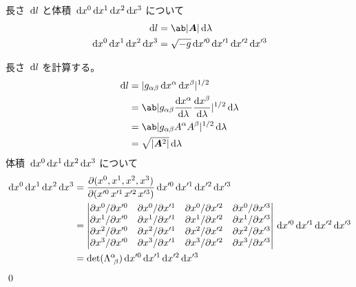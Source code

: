\documentclass[uplatex,dvipdfmx,a4paper,11pt]{jlreq}
\makeatletter
\renewcommand{\AA}{\bm{A}}
\theoremstyle{definition}
\renewenvironment{proof}[1][\proofname]{\par
  \normalfont
  \topsep6\p@\@plus6\p@ \trivlist
  \item[\hskip\labelsep{\bfseries #1}\@addpunct{\bfseries}]\ignorespaces\quad\par
}{%
  \qed\endtrivlist\@endpefalse
}
\renewcommand\proofname{証明}
\makeatother
\begin{document}
\begin{proposition}
  長さ $\dl{l}$ と体積 $\dl{x^0}\dl{x^1}\dl{x^2}\dl{x^3}$ について
  \begin{align}
    \dl{l}                           & = \ab|\AA|\dl{\lambda}                          \\
    \dl{x^0}\dl{x^1}\dl{x^2}\dl{x^3} & = \sqrt{-g}\dl{x'^0}\dl{x'^1}\dl{x'^2}\dl{x'^3}
  \end{align}
\end{proposition}
\begin{proof}
  長さ $\dl{l}$ を計算する。
  \begin{align}
    \dl{l} & = |g_{\alpha\beta}\dl{x^\alpha}\dl{x^\beta}|^{1/2}                                      \\
           & = \ab|g_{\alpha\beta}\diff{x^\alpha}{\lambda}\diff{x^\beta}{\lambda}|^{1/2}\dl{\lambda} \\
           & = \ab|g_{\alpha\beta}A^\alpha A^\beta|^{1/2}\dl{\lambda}                                \\
           & = \sqrt{|\AA^2|}\dl{\lambda}
  \end{align}
  体積 $\dl{x^0}\dl{x^1}\dl{x^2}\dl{x^3}$ について
  \begin{align}
    \dl{x^0}\dl{x^1}\dl{x^2}\dl{x^3} & = \diffp{(x^0, x^1, x^2, x^3)}{(x'^0\, x'^1\, x'^2\, x'^3)}\dl{x'^0}\dl{x'^1}\dl{x'^2}\dl{x'^3}                     \\
                                     & = \begin{vmatrix}
                                           \partial x^0/\partial x'^0 & \partial x^0/\partial x'^1 & \partial x^0/\partial x'^2 & \partial x^0/\partial x'^3 \\
                                           \partial x^1/\partial x'^0 & \partial x^1/\partial x'^1 & \partial x^1/\partial x'^2 & \partial x^1/\partial x'^3 \\
                                           \partial x^2/\partial x'^0 & \partial x^2/\partial x'^1 & \partial x^2/\partial x'^2 & \partial x^2/\partial x'^3 \\
                                           \partial x^3/\partial x'^0 & \partial x^3/\partial x'^1 & \partial x^3/\partial x'^2 & \partial x^3/\partial x'^3 \\
                                         \end{vmatrix}\dl{x'^0}\dl{x'^1}\dl{x'^2}\dl{x'^3} \\
                                     & = \det(\Lambda^\alpha_{\ \beta})\dl{x'^0}\dl{x'^1}\dl{x'^2}\dl{x'^3}

\end{align}
\end{proof}
\end{document}
